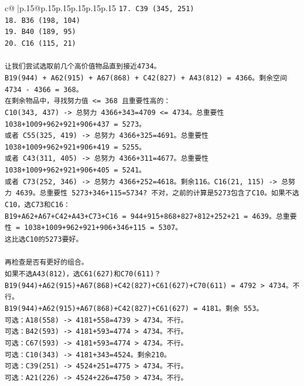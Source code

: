\documentclass{article}
\begin{document}
{\begin{supertabular}{c@{$\;$}|p{.15\linewidth}@{}p{.15\linewidth}p{.15\linewidth}p{.15\linewidth}p{.15\linewidth}p{.15\linewidth}}
{{{\texttt{17. C39 (345, 251)} \\
\texttt{18. B36 (198, 104)} \\
\texttt{19. B40 (189, 95)} \\
\texttt{20. C16 (115, 21)} \\
\\ 
\texttt{让我们尝试选取前几个高价值物品直到接近4734。} \\
\texttt{B19(944) + A62(915) + A67(868) + C42(827) + A43(812) = 4366。剩余空间 4734 {-} 4366 = 368。} \\
\texttt{在剩余物品中，寻找努力值 <= 368 且重要性高的：} \\
\texttt{C10(343, 437) {-}> 总努力 4366+343=4709 <= 4734。总重要性 1038+1009+962+921+906+437 = 5273。} \\
\texttt{或者 C55(325, 419) {-}> 总努力 4366+325=4691。总重要性 1038+1009+962+921+906+419 = 5255。} \\
\texttt{或者 C43(311, 405) {-}> 总努力 4366+311=4677。总重要性 1038+1009+962+921+906+405 = 5241。} \\
\texttt{或者 C73(252, 346) {-}> 总努力 4366+252=4618。剩余116。C16(21, 115) {-}> 总努力 4639。总重要性 5273+346+115=5734? 不对，之前的计算是5273包含了C10。如果不选C10，选C73和C16：} \\
\texttt{B19+A62+A67+C42+A43+C73+C16 = 944+915+868+827+812+252+21 = 4639。总重要性 = 1038+1009+962+921+906+346+115 = 5307。} \\
\texttt{这比选C10的5273要好。} \\
\\ 
\texttt{再检查是否有更好的组合。} \\
\texttt{如果不选A43(812)，选C61(627)和C70(611)？} \\
\texttt{B19(944)+A62(915)+A67(868)+C42(827)+C61(627)+C70(611) = 4792 > 4734。不行。} \\
\texttt{B19(944)+A62(915)+A67(868)+C42(827)+C61(627) = 4181。剩余 553。} \\
\texttt{可选：A18(558) {-}> 4181+558=4739 > 4734。不行。} \\
\texttt{可选：B42(593) {-}> 4181+593=4774 > 4734。不行。} \\
\texttt{可选：C67(593) {-}> 4181+593=4774 > 4734。不行。} \\
\texttt{可选：C10(343) {-}> 4181+343=4524。剩余210。} \\
\texttt{可选：C39(251) {-}> 4524+251=4775 > 4734。不行。} \\
\texttt{可选：A21(226) {-}> 4524+226=4750 > 4734。不行。} \\
}}}
\end{supertabular}}
\end{document}
